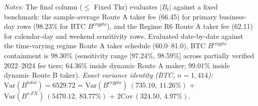\begin{table}[htbp]
\begin{tabular}{@{}>{\raggedright\arraybackslash}p{2.6cm}rrrrrrr@{}}
\bottomrule
\end{tabular}\endgroup
\begin{minipage}{\textwidth}\footnotesize\vspace{3pt}
\emph{Notes:} The final column ($\le$ Fixed Tkr) evaluates $|B_t|$ against a fixed benchmark: the sample-average Route A taker fee (66.45) for primary business-day rows (98.23\% for BTC $B^{crypto}$), and the Regime R6 Route A taker fee (62.11) for calendar-day and weekend sensitivity rows. Evaluated date-by-date against the time-varying regime Route A taker schedule (60.0--81.0), BTC $B^{crypto}$ containment is 98.30\% (sensitivity range [97.24\%, 98.59\%] across partially verified 2022--2024 fee tiers; 64.36\% inside dynamic Route A maker; 99.01\% inside dynamic Route B taker). \emph{Exact variance identity (BTC, $n=1,414$):} $\mathrm{Var}(B^{total}) = 6529.72$ = $\mathrm{Var}(B^{crypto})\ (735.10,\ 11.26\%)$ + $\mathrm{Var}(B^{s\text{-}FX})\ (5470.12,\ 83.77\%)$ + $2\mathrm{Cov}\,(324.50,\ 4.97\%)$.
\end{minipage}
\end{table}

